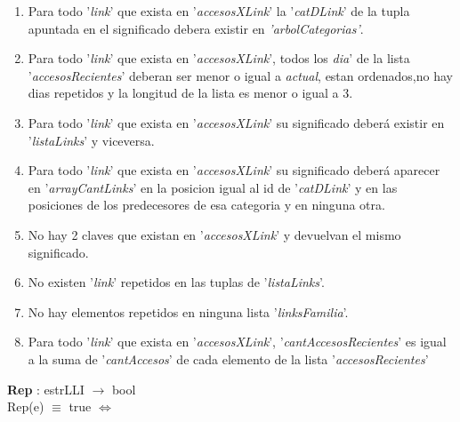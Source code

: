 \documentclass[10pt, a4paper]{article}
\begin{document}
	  \begin{enumerate}
	
		\item Para todo '\textit{link}' que exista en '\textit{accesosXLink}' la '\textit{catDLink}' de la tupla apuntada en el significado debera existir en \textit{'arbolCategorias'}.
	  
		\item Para todo '\textit{link}' que exista en '\textit{accesosXLink}', todos los \textit{dia}' de la lista '\textit{accesosRecientes}' deberan ser menor o igual a \textit{actual}, estan ordenados,no hay dias repetidos y la longitud de la lista es menor o igual a 3.
		
		\item Para todo '\textit{link}' que exista en '\textit{accesosXLink}' su significado deberá existir en '\textit{listaLinks}' y viceversa.

		\item Para todo '\textit{link}' que exista en '\textit{accesosXLink}' su significado deberá aparecer en '\textit{arrayCantLinks}' en la posicion igual al id de '\textit{catDLink}' y en las posiciones de los predecesores de esa categoria y en ninguna otra.

		\item No hay 2 claves que existan en '\textit{accesosXLink}' y devuelvan el mismo significado.

		\item No existen '\textit{link}' repetidos en las tuplas de  '\textit{listaLinks}'.

		\item No hay elementos repetidos en ninguna lista '\textit{linksFamilia}'.

		\item Para todo '\textit{link}' que exista en '\textit{accesosXLink}', '\textit{cantAccesosRecientes}' es igual a la suma de '\textit{cantAccesos}' de cada elemento de la lista '\textit{accesosRecientes}'

	  \end{enumerate}
	 
	
	   \textbf{Rep} : estrLLI $\longrightarrow$ bool\\
	        Rep(e) $\equiv$ true $\Longleftrightarrow$\\
	
\end{document}

